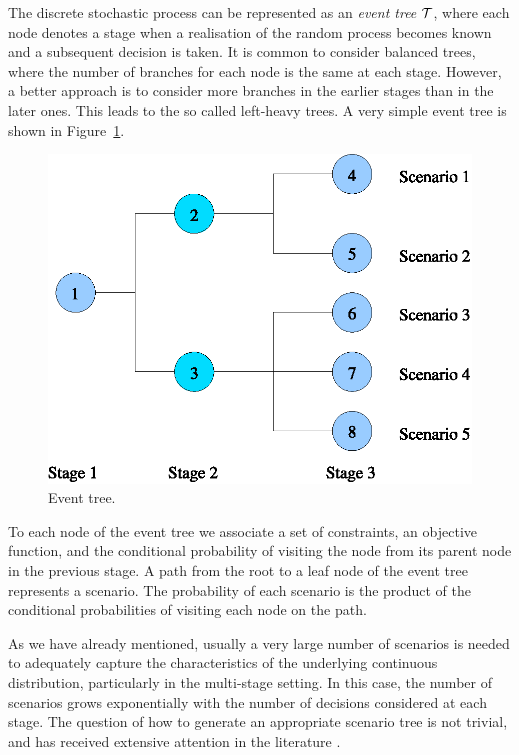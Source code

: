 The discrete stochastic process can be represented as an 
{\em event tree} $\mathcal{T}$,
where each node denotes a stage when a realisation 
of the random process becomes known and a subsequent decision is taken.
It is common to consider balanced trees, where the number of
branches for each node is the same at each stage.
However, a better approach is to consider more branches in the
earlier stages than in the later ones. This leads to the
so called left-heavy trees.
A very simple event tree is shown in Figure~\ref{fig:EventTree}.
%
\begin{figure}[ht]
  \begin{center}
    \includegraphics[scale=0.6]{figures/tree.eps}
    \caption{Event tree.}
    \label{fig:EventTree}
  \end{center}
  \vspace{-3ex}
\end{figure}

To each node of the event tree we associate a set of constraints, an 
objective function, and the conditional probability of visiting the 
node from its parent node in the previous stage.
A path from the root to a leaf node of the event tree represents a 
scenario.
The probability of each scenario is the product of the 
conditional probabilities of visiting each node on the path.

As we have already mentioned, usually a very large number of scenarios is
needed to adequately capture the characteristics of the underlying
continuous distribution, particularly in the multi-stage setting.
In this case, the number of scenarios grows exponentially with the
number of decisions considered at each stage.
The question of how to generate an appropriate scenario tree
is not trivial, and has received extensive attention in the
literature 
\cite{DupacovaConsigliWallace,HoylandKautWallace,HoylandWallace,Pflug01}.

